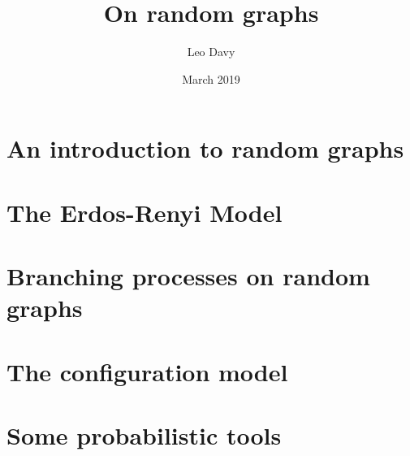\documentclass{report}
\title{On random graphs}
\author{Leo Davy }
\date{March 2019}
\theoremstyle{definition}
\begin{document}
\maketitle
\tableofcontents{}

\chapter{An introduction to random graphs}


\chapter{The Erdos-Renyi Model}


\chapter{Branching processes on random graphs}


\chapter{The configuration model}


\appendix

\chapter{Some probabilistic tools}

\end{document}
